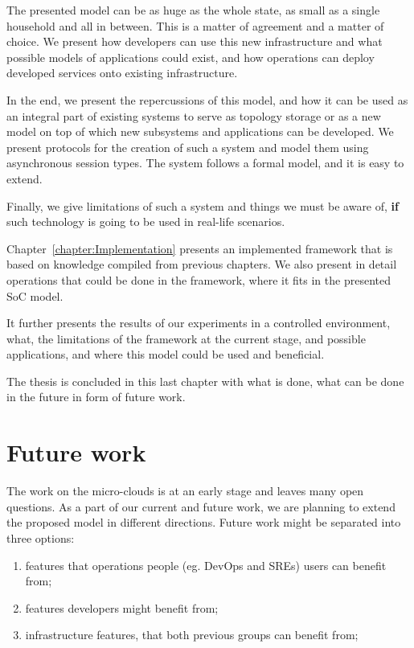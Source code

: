 The presented model can be as huge as the whole state, as small as a single household and all in between. This is a matter of agreement and a matter of choice. We present how developers can use this new infrastructure and what possible models of applications could exist, and how operations can deploy developed services onto existing infrastructure.

In the end, we present the repercussions of this model, and how it can be used as an integral part of existing systems to serve as topology storage or as a new model on top of which new subsystems and applications can be developed. We present protocols for the creation of such a system and model them using asynchronous session types. The system follows a formal model, and it is easy to extend.

Finally, we give limitations of such a system and things we must be aware of, \textbf{if} such technology is going to be used in real-life scenarios.

Chapter~\ref{chapter:Implementation} presents an implemented framework that is based on knowledge compiled from previous chapters. We also present in detail operations that could be done in the framework, where it fits in the presented SoC model.

It further presents the results of our experiments in a controlled environment, what, the limitations of the framework at the current stage, and possible applications, and where this model could be used and beneficial.

The thesis is concluded in this last chapter with what  is done, what can be done in the future in form of future work.
%
%
\section{Future work}\label{sec:future_work}
%
The work on the micro-clouds is at an early stage and leaves many open questions. As a part of our current and future work, we are planning to extend the proposed model in different directions. Future work might be separated into three options:
 
\begin{enumerate}[start=1,label={(\bfseries \arabic*)}]
	\item features that operations people (eg. DevOps and SREs) users can benefit from;
	\item features developers might benefit from;
	\item infrastructure features, that both previous groups can benefit from;
\end{enumerate}

